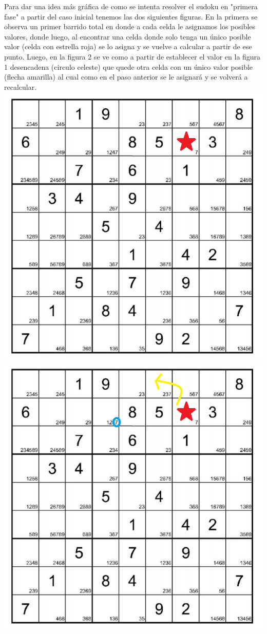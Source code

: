 Para dar una idea más gráfica de como se intenta resolver el sudoku en "primera fase" a partir del caso inicial tenemos las dos siguientes figuras. En la primera se observa un primer barrido total en donde a cada celda le asignamos los posibles valores, donde luego, al encontrar una celda donde solo tenga un único posible valor (celda con estrella roja) se lo asigna y se vuelve a calcular a partir de ese punto. Luego, en la figura 2 se ve como a partir de establecer el valor en la figura 1 desencadena (circulo celeste) que quede otra celda con un único valor posible (flecha amarilla) al cual como en el paso anterior se le asignará y se volverá a recalcular.
\includegraphics[scale=0.6]{imgs/inicial.png}	\\
\includegraphics[scale=0.6]{imgs/inicial2.png}	
